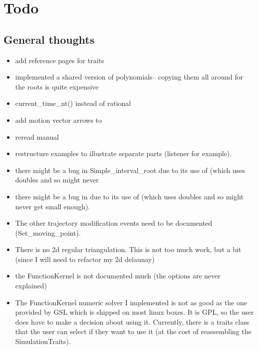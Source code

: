 \section{Todo}

\subsection{General thoughts}

\begin{itemize}

\item add reference pages for traits

\item implemented a shared version of polynomials-- copying them all around for the roots is quite expensive

\item current\_time\_nt() instead of rational

\item add motion vector arrows to 

\item reread manual

\item restructure examples to illustrate separate parts (listener for example).

\item there might be a bug in Simple\_interval\_root due to its use of
   (which uses doubles and so might never

\item there might be a bug in  due to its use of
   (which uses doubles and so might never
  get small enough).

\item The other trajectory modification events need to be documented
  (Set\_moving\_point). 

\item There is no 2d regular triangulation. This is not too much work,
  but a bit (since I will need to refactor my 2d delaunay)

\item the FunctionKernel is not documented much (the options are never
  explained)

\item The FunctionKernel numeric solver I implemented is not as good
  as the one provided by GSL which is shipped on most linux boxes. It
  is GPL, so the user does have to make a decision about using it.
  Currently, there is a traits class that the user can select if they
  want to use it (at the cost of reassembling the SimulationTraits).

\end{itemize}

